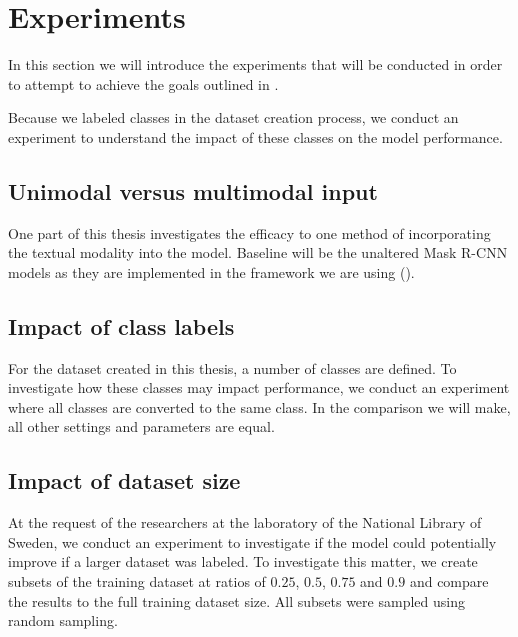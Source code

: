 \documentclass[oneside, english, bibtex]{kththesis}
\begin{document}
\clearpage

\section{Experiments}
\label{sec:experiments}

In this section we will introduce the experiments that will be conducted in order to attempt to achieve the goals outlined in .

Because we labeled classes in the dataset creation process, we conduct an experiment to understand the impact of these classes on the model performance.



\subsection{Unimodal versus multimodal input}

One part of this thesis investigates the efficacy to one method of incorporating the textual modality into the model.
Baseline will be the unaltered Mask R-CNN models as they are implemented in the framework we are using ().

\subsection{Impact of class labels}

For the dataset created in this thesis, a number of classes are defined.
To investigate how these classes may impact performance, we conduct an experiment where all classes are converted to the same class.
In the comparison we will make, all other settings and parameters are equal.

\subsection{Impact of dataset size}

At the request of the researchers at the laboratory of the National Library of Sweden, we conduct an experiment to investigate if the model could potentially improve if a larger dataset was labeled. To investigate this matter, we create subsets of the training dataset at ratios of $0.25$, $0.5$, $0.75$ and $0.9$ and compare the results to the full training dataset size. All subsets were sampled using random sampling.
\end{document}
